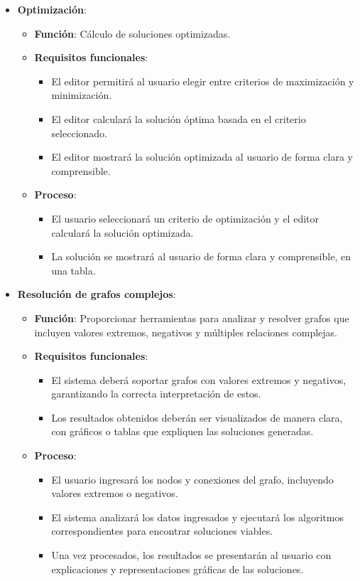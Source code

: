 \documentclass[stu, 12pt, letterpaper, donotrepeattitle, floatsintext, natbib]{apa7}
\begin{document}
\begin{itemize}
    \item \textbf{Optimización}:
    \begin{itemize}
        \item \textbf{Función}: Cálculo de soluciones optimizadas.
        \item \textbf{Requisitos funcionales}:
            \begin{itemize}
                \item El editor permitirá al usuario elegir entre criterios de maximización y minimización.
                \item El editor calculará la solución óptima basada en el criterio seleccionado.
                \item El editor mostrará la solución optimizada al usuario de forma clara y comprensible.
            \end{itemize}
        \item \textbf{Proceso}:
            \begin{itemize}
                \item El usuario seleccionará un criterio de optimización y el editor calculará la solución optimizada.
                \item La solución se mostrará al usuario de forma clara y comprensible, en una tabla.
            \end{itemize}
    \end{itemize}

    \item \textbf{Resolución de grafos complejos}:
    \begin{itemize}
        \item \textbf{Función}: Proporcionar herramientas para analizar y resolver grafos que incluyen valores extremos, negativos y múltiples relaciones complejas.
        \item \textbf{Requisitos funcionales}:
            \begin{itemize}
                \item El sistema deberá soportar grafos con valores extremos y negativos, garantizando la correcta interpretación de estos.
                \item Los resultados obtenidos deberán ser visualizados de manera clara, con gráficos o tablas que expliquen las soluciones generadas.
            \end{itemize}
        \item \textbf{Proceso}:
            \begin{itemize}
                \item El usuario ingresará los nodos y conexiones del grafo, incluyendo valores extremos o negativos.
                \item El sistema analizará los datos ingresados y ejecutará los algoritmos correspondientes para encontrar soluciones viables.
                \item Una vez procesados, los resultados se presentarán al usuario con explicaciones y representaciones gráficas de las soluciones.
            \end{itemize}
    \end{itemize}


\end{itemize}
\end{document}
